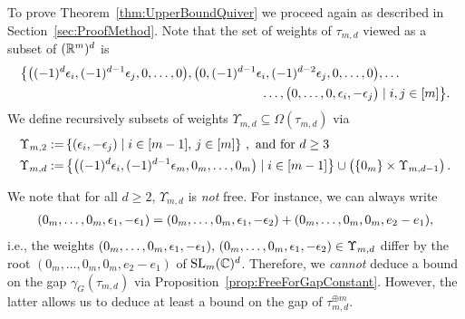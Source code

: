 To prove Theorem~\ref{thm:UpperBoundQuiver} we proceed again as described in Section~\ref{sec:ProofMethod}. Note that the set of weights of $\tau_{m,d}$ viewed as a subset of $(\mathbb R^{m})^d$ is
\begin{align*}
	\big\lbrace \big( (-1)^d \epsilon_i, (-1)^{d-1} \epsilon_j,0,\ldots,0 \big), \big( 0, (-1)^{d-1} \epsilon_i, (-1)^{d-2} \epsilon_j,0,\ldots,0 \big)&, \ldots \\
	\ldots, \big( 0,\ldots,0,\epsilon_i, - \epsilon_j \big) &\mid i,j \in [m] \big\rbrace.
\end{align*}
We define recursively subsets of weights $\Upsilon_{m,d} \subseteq \Omega(\tau_{m,d})$ via
\begin{align*}
	\Upsilon_{m,2} := &\left\lbrace (\epsilon_i, -\epsilon_j) \mid i \in [m-1], \, j \in [m] \right\rbrace
	\, , \text{ and for } d \geq 3 \\
	\Upsilon_{m,d} := &\left\lbrace \big( (-1)^d \epsilon_i, (-1)^{d-1} \epsilon_m,0_m,\ldots,0_m \big) \mid i \in [m-1] \right\rbrace \cup \big( \lbrace 0_m \rbrace \times \Upsilon_{m,d-1} \big) \, .
\end{align*}

\begin{remark} \label{rem:QuiverNotFree}
	We note that for all $d \geq 2$, $\Upsilon_{m,d}$ is \emph{not} free. For instance, we can always write
	\begin{align*}
		(0_m,\ldots,0_m, \epsilon_1, - \epsilon_1) = (0_m,\ldots,0_m, \epsilon_1, - \epsilon_2) + (0_m,\ldots,0_m,0_m, e_2 - e_1),
	\end{align*}
	i.e., the weights $(0_m,\ldots,0_m, \epsilon_1, - \epsilon_1), \, (0_m,\ldots,0_m, \epsilon_1, - \epsilon_2) \in \Upsilon_{m,d}$ differ by the root $(0_m,\ldots,0_m,0_m, e_2 - e_1)$ of $\operatorname{SL}_m(\mathbb C)^d$.
	Therefore, we \emph{cannot} deduce a bound on the gap $\gamma_G(\tau_{m,d})$ via Proposition~\ref{prop:FreeForGapConstant}. However, the latter allows us to deduce at least a bound on the gap of $\tau_{m,d}^{\oplus m}$.
	\hfill\remSymbol
\end{remark}

